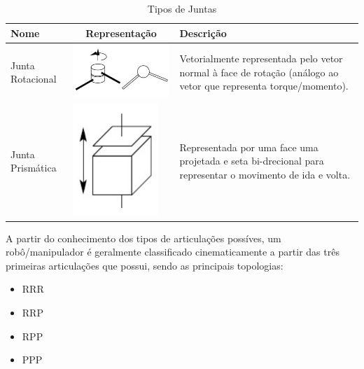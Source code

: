 \documentclass{article}
\begin{document}
        \begin{table}[h]
            \centering
            \begin{tabular}{lcl} 
                 Nome & Representação & Descrição  \\ \hline
                 Junta Rotacional & \begin{minipage}{0.5\linewidth}
                     \centering
                     \includegraphics[width=0.5\linewidth]{imgs/rotacional.jpg}
                 \end{minipage} & \begin{minipage}{0.3\linewidth}Vetorialmente representada pelo vetor normal à face de rotação (análogo ao vetor que representa torque/momento). \end{minipage} \\ 
                 Junta Prismática & \begin{minipage}{0.5\linewidth}
                     \centering
                     \includegraphics[width=0.25\linewidth]{imgs/prismática.png}
                 \end{minipage} & \begin{minipage}{0.3\linewidth}Representada por uma face uma projetada e seta bi-drecional para representar o movimento de ida e volta. \end{minipage} \\ 
            \end{tabular}
            \caption{Tipos de Juntas}
        \end{table}

        A partir do conhecimento dos tipos de articulações possíves, um robô/manipulador é geralmente classificado cinematicamente a partir das três primeiras articulações que possui, sendo as principais topologias:
        \begin{itemize}
            \item RRR
            \item RRP
            \item RPP
            \item PPP
        \end{itemize}
        
\end{document}
